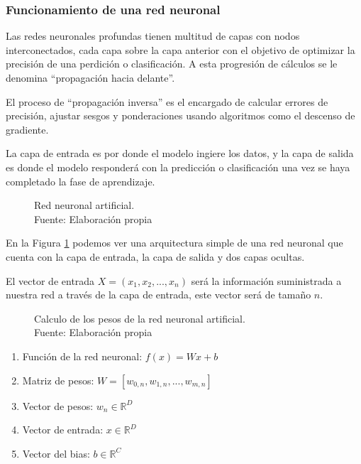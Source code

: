 \subsubsection{Funcionamiento de una red neuronal \label{neural-network}}

Las redes neuronales profundas tienen multitud de capas con nodos interconectados, cada capa sobre la capa anterior con el objetivo de optimizar la precisión de una perdición o clasificación. A esta progresión de cálculos se le denomina ``propagación hacia delante''.

El proceso de ``propagación inversa'' es el encargado de calcular errores de precisión, ajustar sesgos y ponderaciones usando algoritmos como el descenso de gradiente.


La capa de entrada es por donde el modelo ingiere los datos, y la capa de salida es donde el modelo responderá con la predicción o clasificación una vez se haya completado la fase de aprendizaje.

\begin{figure}[H]
    \centering
    \centerline{}
    \caption{Red neuronal artificial.\\Fuente: Elaboración propia}
    \label{fig:artificial-neuronal-network}
\end{figure}

En la Figura \ref{fig:artificial-neuronal-network} podemos ver una arquitectura simple de una red neuronal que cuenta con la capa de entrada, la capa de salida y dos capas ocultas.

El vector de entrada $X = (x_{1}, x_{2}, ..., x_{n})$ será la información suministrada a nuestra red a través de la capa de entrada, este vector será de tamaño $n$.


\begin{figure}[H]
    \centering
    \centerline{}
    \caption{Calculo de los pesos de la red neuronal artificial.\\Fuente: Elaboración propia}
    \label{fig:notation}
\end{figure}

\begin{enumerate}
    \item Función de la red neuronal: $f(x) = W x + b$
    \item Matriz de pesos: $W = \left[w_{0,n}, w_{1,n}, ...,w_{m,n}\right]$
    \item Vector de pesos: $w_{n} \in \mathbb{R}^{D}$
    \item Vector de entrada: $x \in \mathbb{R}^{D}$
    \item Vector del bias: $b \in \mathbb{R}^{C}$
\end{enumerate}

